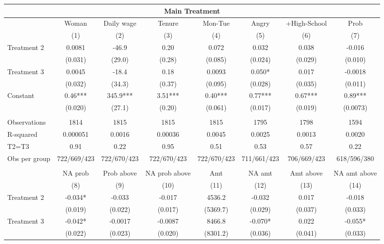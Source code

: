 \begin{tabular}{lccccccc}
\toprule
\multicolumn{8}{c}{Main Treatment} \\
\midrule
\midrule
      & Woman  & Daily wage & Tenure & Mon-Tue & Angry & +High-School & Prob \\
\midrule
\midrule
      & (1)   & (2)   & (3)   & (4)   & (5)   & (6)   & (7) \\
\midrule
Treatment 2 & 0.0081 & -46.9 & 0.20  & 0.072 & 0.032 & 0.038 & -0.016 \\
      & (0.031) & (29.0) & (0.28) & (0.085) & (0.024) & (0.029) & (0.010) \\
Treatment 3 & 0.0045 & -18.4 & 0.18  & 0.0093 & 0.050* & 0.017 & -0.0018 \\
      & (0.032) & (34.3) & (0.37) & (0.095) & (0.028) & (0.035) & (0.011) \\
Constant  & 0.46*** & 345.9*** & 3.51*** & 0.40*** & 0.77*** & 0.67*** & 0.89*** \\
      & (0.020) & (27.1) & (0.20) & (0.061) & (0.017) & (0.019) & (0.0073) \\
      &       &       &       &       &       &       &  \\
\midrule
Observations & 1814  & 1815  & 1815  & 1815  & 1795  & 1798  & 1594 \\
R-squared & 0.000051 & 0.0016 & 0.00036 & 0.0045 & 0.0025 & 0.0013 & 0.0020 \\
T2=T3 & 0.91  & 0.22  & 0.95  & 0.51  & 0.53  & 0.57  & 0.22 \\
Obs per group & 722/669/423 & 722/670/423 & 722/670/423 & 722/670/423 & 711/661/423 & 706/669/423 & 618/596/380 \\
\midrule
\midrule
      &       &       &       &       &       &       &  \\
      & NA prob & Prob above & NA prob above & Amt   & NA amt & Amt above & NA amt above \\
\midrule
\midrule
      & (8)   & (9)   & (10)  & (11)  & (12)  & (13)  & (14) \\
\midrule
Treatment 2 & -0.034* & -0.033 & -0.017 & 4536.2 & -0.032 & 0.017 & -0.018 \\
      & (0.019) & (0.022) & (0.017) & (5369.7) & (0.029) & (0.037) & (0.033) \\
Treatment 3 & -0.042* & -0.0017 & -0.0087 & 8466.8 & -0.070* & 0.022 & -0.055* \\
      & (0.022) & (0.023) & (0.020) & (8301.2) & (0.036) & (0.041) & (0.033) \\

\end{tabular}
